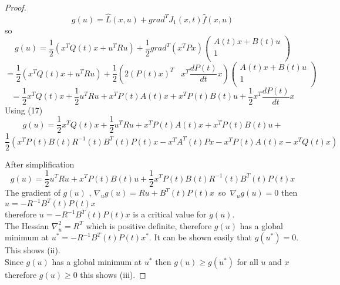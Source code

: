 \documentclass[12pt]{article}
\begin{document}
\begin{proof}
$$g(u)=\hat{L}(x,u)+grad^TJ_1(x,t)\hat{f}(x,u)$$
so
$$g(u)=\frac{1}{2}
({x}^TQ(t)x+{u}^TRu)+\frac{1}{2}grad^T({x}^TPx)
\left(\begin{array}{c}
  A(t)x+B(t)u      \\
1\\   
\end{array}\right)$$
$$=\frac{1}{2}
({x}^TQ(t)x+{u}^TRu)+\frac{1}{2}(2(P(t)x)^T \, \, \, \, \, {x}^T\frac{dP(t)}{dt}x)
\left(\begin{array}{c}
  A(t)x+B(t)u      \\
1\\   
\end{array}\right)
$$
$$=\frac{1}{2}x^{T}Q(t)x+
\frac{1}{2}u^{T}Ru+x^{T}P(t)A(t)x+x^{T}P(t)B(t)u+
\frac{1}{2}x^T\frac{dP(t)}{dt}x$$
Using (17)
$$g(u)=\frac{1}{2}{x}^TQ(t)x+\frac{1}{2}{u}^TRu+{x}^TP(t)A(t)x+
x^TP(t)B(t)u+$$
$$\frac{1}{2}({x}^TP(t)B(t)R^{-1}(t)B^T(t)P(t)x
-{x}^TA^T(t)Px-{x}^TP(t)A(t)x-{x}^TQ(t)x)$$

After simplification
$$g(u)=\frac{1}{2}{u}^{T}Ru+{x}^{T}P(t)B(t)u+
\frac{1}{2}x^{T}P(t)B(t)R^{-1}(t)B^T(t)P(t)x$$
The gradient of $g(u)\, \, $,  
$\nabla_ug(u)=Ru+B^T(t)P(t)x\,$  so $\, \nabla_{u}g(u)=0$ then 
$u=-R^{-1}B^T(t)P(t)x$\\
therefore $u=-R^{-1}B^T(t)P(t)x$ is a critical value for $g(u)$.\\
The Hessian $\nabla_{u}^2=R^T$ which is positive definite, therefore 
$g(u)$ has a global minimum at $u^*=-R^{-1}B^T(t)P(t)x^*$.
It can be shown easily   that $g(u^*)=0$. This shows  (ii).\\
Since $g(u)$ has a global minimum at $u^*$ then
$g(u)\geq g(u^*)$ for all $u$ and $x$ therefore $g(u)\geq 0$ 
this shows (iii).



\end{proof} 





 
\end{document}
